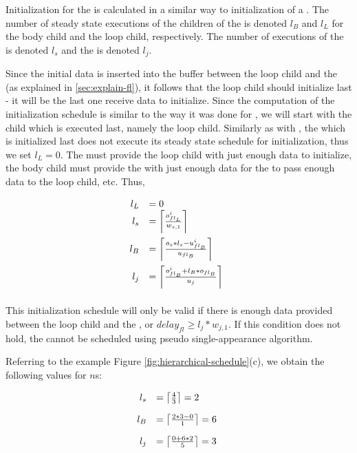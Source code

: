 
Initialization for the {\feedbackloop} is calculated in a similar
way to initialization of a {\pipeline}.  The number of steady
state executions of the children of the {\feedbackloop} is denoted
$l_B$ and $l_L$ for the body child and the loop child,
respectively. The number of executions of the {\splitter} is
denoted $l_s$ and the {\joiner} is denoted $l_j$.

Since the initial data is inserted into the buffer between the
loop child and the {\joiner} (as explained in \ref{sec:explain-fl}),
it follows that the loop child should initialize last - it will be
the last one receive data to initialize. Since the computation of
the initialization schedule is similar to the way it was done for
{\pipeline}, we will start with the child which is executed last,
namely the loop child. Similarly as with {\pipeline}, the which is
initialized last does not execute its steady state schedule for
initialization, thus we set $l_L = 0$. The {\splitter} must provide
the loop child with just enough data to initialize, the body child
must provide the {\splitter} with just enough data for the {\splitter}
to pass enough data to the loop child, etc. Thus,

\begin{displaymath}
\begin{array}{rl}
l_L & = 0 \\
l_{s} & = \left\lceil {o^i_{fl_L} \over w_{s,1}} \right\rceil \raisebox{-0.2in}{ } \\
l_{B} & = \left\lceil o_{s} * l_{s} - u^i_{fl_B} \over u_{fl_B} \right\rceil \raisebox{-0.2in}{ } \\
l_{j} & = \left\lceil o^i_{fl_B} + l_B * o_{fl_B} \over u_{j}
\right\rceil \raisebox{-0.2in}{ }
\end{array}
\end{displaymath}

This initialization schedule will only be valid if there is enough
data provided between the loop child and the {\joiner}, or
$delay_{fl} \ge l_j * w_{j,1}$.  If this condition does not hold,
the {\feedbackloop} cannot be scheduled using pseudo
single-appearance algorithm.

Referring to the example Figure
\ref{fig:hierarchical-schedule}(c), we obtain the following values
for $n$s:

\begin{displaymath}
\begin{array}{rl}
l_{s} & = \left\lceil {4 \over 3} \right\rceil = 2 \raisebox{-0.2in}{ } \\
l_{B} & = \left\lceil 2 * 3 - 0 \over 1 \right\rceil = 6 \raisebox{-0.2in}{ } \\
l_{j} & = \left\lceil 0 + 6 * 2 \over 5 \right\rceil = 3 \raisebox{-0.2in}{ } \\
\end{array}
\end{displaymath}

